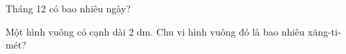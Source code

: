 \begin{ex} %
Tháng 12 có bao nhiêu ngày?
\end{ex}

\begin{ex} %
Một hình vuông có cạnh dài 2 dm. Chu vi hình vuông đó là bao nhiêu xăng-ti-mét?
\end{ex}
